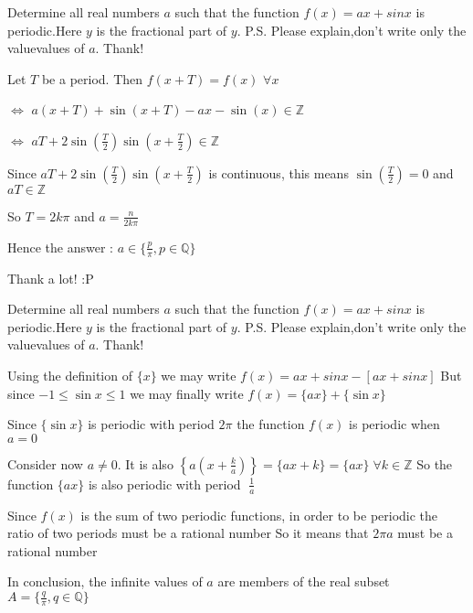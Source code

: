 \begin{solution}
	\begin{tcolorbox}Determine all real numbers $ a$ such that the function $ f(x) =${$ ax + sinx$}  is periodic.Here {$ y$} is the fractional part of $ y$.
P.S. Please explain,don't write only the value\/values of $ a$. Thank!\end{tcolorbox}

Let $ T$ be a period. Then $ f(x+T)=f(x)$ $ \forall x$

$ \iff$ $ a(x+T)+\sin(x+T)-ax-\sin(x)\in\mathbb Z$

$ \iff$ $ aT+2\sin(\frac T2)\sin(x+\frac T2)\in\mathbb Z$

Since $ aT+2\sin(\frac T2)\sin(x+\frac T2)$ is continuous, this means $ \sin(\frac T2)=0$ and $ aT\in\mathbb Z$

So $ T=2k\pi$ and $ a=\frac{n}{2k\pi}$

Hence the answer : $ \boxed{a\in\{\frac p{\pi},p\in\mathbb Q\}}$
\end{solution}



\begin{solution}
	Thank a lot!  :P
\end{solution}



\begin{solution}
	\begin{tcolorbox}Determine all real numbers $ a$ such that the function $ f(x) =${$ ax + sinx$}  is periodic.Here {$ y$} is the fractional part of $ y$.
P.S. Please explain,don't write only the value\/values of $ a$. Thank!\end{tcolorbox}

Using the definition of $ \{x\}$ we may write $ f(x) = ax + sinx - [ax + sinx]$
But since $ -1 \le \sin x \le 1$ we may finally write $ f(x) = \{ax\} +  \{\sin x\}$

Since $ \{\sin x\}$ is periodic with period $ 2\pi$ the function $ f(x)$ is periodic when $ a=0$

Consider now $ a \neq 0$. It is also $ \left\{a\left(x + \frac{k}{a}\right)\right\} = \{ax + k\} = \{ax\}\;\forall k \in \mathbb{Z}$
So the function $ \{ax\}$ is also periodic with period $ \;\frac1a$

Since $ f(x)$ is the sum of two periodic functions, in order to be periodic the ratio of two periods must be a rational number
So it means that   $ 2 \pi a$ must be a rational number

In conclusion, the infinite values of $ a$ are members of the real subset $ A=\{\frac{q}{\pi}, q \in \mathbb{Q} \}$
\end{solution}



